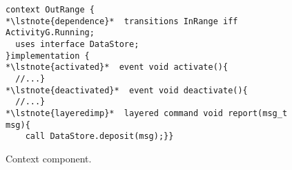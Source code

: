 \begin{figure}[!tb]
\begin{lstlisting}[style=conescframe]
context OutRange {
*\lstnote{dependence}*  transitions InRange iff ActivityG.Running;
  uses interface DataStore;
}implementation {
*\lstnote{activated}*  event void activate(){
  //...}
*\lstnote{deactivated}*  event void deactivate(){
  //...}
*\lstnote{layeredimp}*  layered command void report(msg_t msg){
    call DataStore.deposit(msg);}}
\end{lstlisting}
\vspace{-4mm}
\caption{Context component.}
  \label{fig:cc}
\vspace{-2mm}
\end{figure}